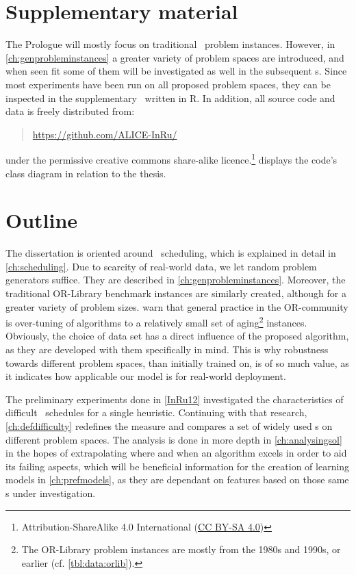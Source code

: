 \section{Supplementary material}
The Prologue will mostly focus on traditional \jsp\ problem instances. 
However, in \cref{ch:genprobleminstances} a greater variety of problem spaces 
are introduced, and when seen fit some of them will be investigated as well 
in the subsequent s. 
Since most experiments have been run on all proposed problem spaces, they can be 
inspected in the supplementary \shiny\ written in R. 
In addition, all source code and data is freely distributed from:
\begin{quote}
    \url{https://github.com/ALICE-InRu/}
\end{quote}
under the permissive creative commons share-alike 
licence.\footnote{Attribution-ShareAlike 4.0 International 
    (\href{http://creativecommons.org/licenses/by-sa/4.0/}{CC BY-SA 4.0})}
 displays the code's class diagram in relation to the 
thesis.



\section{Outline}
The dissertation is oriented around \jsp\ scheduling, which is explained in 
detail in \cref{ch:scheduling}.
Due to scarcity of real-world data, we let random problem generators 
suffice. They are described in \cref{ch:genprobleminstances}. Moreover, the 
traditional 
OR-Library benchmark instances are similarly created, although for a greater 
variety of problem sizes. 
\citet{SmithMiles2015} warn that general practice in the OR-community is over-tuning of algorithms to a relatively small set of aging\footnote{
	The OR-Library problem instances are mostly from the 1980s and 
	1990s, or earlier (cf. \cref{tbl:data:orlib}).}
instances. 
Obviously, the choice of data set has a direct influence of the proposed 
algorithm, as they are developed with them specifically in mind. 
This is why robustness towards different problem spaces, than initially trained 
on, is of so much value, as it indicates how applicable our model is for 
real-world deployment.

The preliminary experiments done in \cref{InRu12} investigated the 
characteristics of difficult \jsp\ schedules for a single heuristic. Continuing 
with that research, \cref{ch:defdifficulty} redefines the measure and compares a set of widely used \sdr s on different problem spaces.
The analysis is done in more depth in \cref{ch:analysingsol} in the hopes of extrapolating where and when an algorithm excels in order to aid its failing aspects, which will be beneficial information for the creation of learning models in \cref{ch:prefmodels}, as they are dependant  on features based on those same \dr s under investigation.


